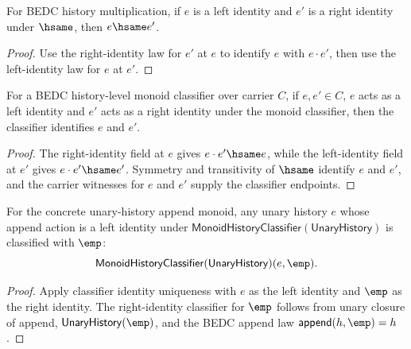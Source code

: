 \begin{theorem}
\label{thm:monoid-identity-unique}
For BEDC history multiplication, if \(e\) is a left identity and \(e'\) is a
right identity under \(\hsame\), then \(e\hsame e'\).
\end{theorem}
\begin{proof}
Use the right-identity law for \(e'\) at \(e\) to identify \(e\) with
\(e\cdot e'\), then use the left-identity law for \(e\) at \(e'\).
\end{proof}

\begin{theorem}
\label{thm:monoid-history-classifier-identity-unique}
For a BEDC history-level monoid classifier over carrier $C$, if $e,e'\in C$,
$e$ acts as a left identity and $e'$ acts as a right identity under the monoid
classifier, then the classifier identifies $e$ and $e'$.
\end{theorem}
\begin{proof}
The right-identity field at $e$ gives $e\cdot e'\hsame e$, while the
left-identity field at $e'$ gives $e\cdot e'\hsame e'$. Symmetry and
transitivity of $\hsame$ identify $e$ and $e'$, and the carrier witnesses for
$e$ and $e'$ supply the classifier endpoints.
\end{proof}

\begin{theorem}
\label{thm:unary-append-monoid-left-identity-empty}
For the concrete unary-history append monoid, any unary history $e$ whose
append action is a left identity under
$\mathsf{MonoidHistoryClassifier}(\mathsf{UnaryHistory})$ is classified with
$\emp$:
$$
\mathsf{MonoidHistoryClassifier}(\mathsf{UnaryHistory})(e,\emp).
$$
\end{theorem}
\begin{proof}
Apply classifier identity uniqueness with $e$ as the left identity and $\emp$
as the right identity. The right-identity classifier for $\emp$ follows from
unary closure of append, $\mathsf{UnaryHistory}(\emp)$, and the BEDC append law
$\mathsf{append}(h,\emp)=h$.
\end{proof}

